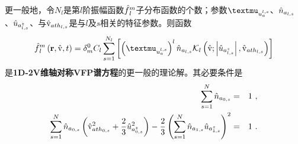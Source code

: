   \begin{proposition} \label{定理-VFP的解1D2V-King混合分布sl}
      更一般地，令$N_l$是第$l$阶振幅函数$\hat{f}{_{l}^m}$子分布函数的个数；参数$\muuasl$、$\hat{n}_{a_{l,s}}$、${\hat{u}}_{a_{l,s}^z}$、与$\hat{\mathrm{v}}_{{ath}_{l,s}}$是与$l$及$s$相关的特征参数。则函数
      \begin{eqnarray}
        \fhlm \left(\r,\rmvh,t \right) = \delta_m^0 C_l \sum_{s=1}^{N_l} \left [ \left (\muuasl \right)^l \nhasl \Kl \left(\rmvh;\left |\uhazsl \right | , \vhathsl \right) \right ]   \label{fhlfhlsl}
      \end{eqnarray}
      是\textbf{1D-2V维轴对称VFP谱方程}的更一般的理论解。其必要条件是
      \begin{eqnarray}
        \sum_{s=1}^{N} \hat{n}_{a_{0,s}} &=& 1 ~, \label{nhaslAxis0}
        \\
        \sum_{s=1}^{N} \hat{n}_{a_{0,s}} \left(\hat{\mathrm{v}}_{{ath}_{0,s}}^2 + \frac{2}{3} {\hat{u}}_{a_{0,s}^z}^2 \right) - \frac{2}{3}  \left(\sum_{s=1}^{N} \hat{n}_{a_{1,s}} {\hat{u}}_{a_{1,s}^z} \right)^2  &=& 1 ~ . \label{ThaslAxis0}
      \end{eqnarray}
  \end{proposition}
  
